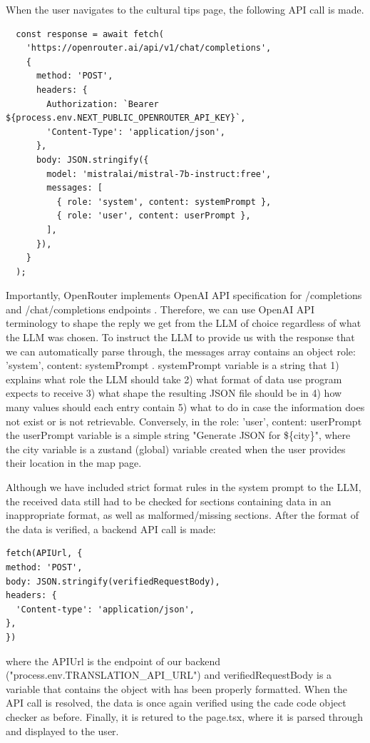 When the user navigates to the cultural tips page, the following API call is made. 
\begin{verbatim} 
  const response = await fetch(
    'https://openrouter.ai/api/v1/chat/completions',
    {
      method: 'POST',
      headers: {
        Authorization: `Bearer ${process.env.NEXT_PUBLIC_OPENROUTER_API_KEY}`,
        'Content-Type': 'application/json',
      },
      body: JSON.stringify({
        model: 'mistralai/mistral-7b-instruct:free',
        messages: [
          { role: 'system', content: systemPrompt },
          { role: 'user', content: userPrompt },
        ],
      }),
    }
  );
\end{verbatim}
Importantly, OpenRouter implements OpenAI API specification for /completions and /chat/completions endpoints \cite{noauthor_openrouter_nodate}. Therefore, we can use OpenAI API terminology \cite{openAI_explanation_onHowToUseTheirApi} to shape the reply we get from the LLM of choice regardless of what the LLM was chosen. To instruct the LLM to provide us with the response that we can automatically parse through, the messages array contains an object { role: 'system', content: systemPrompt }. systemPrompt variable is a string that 1) explains what role the LLM should take 2) what format of data use program expects to receive 3) what shape the resulting JSON file should be in 4) how many values should each entry contain 5) what to do in case the information does not exist or is not retrievable. Conversely, in the { role: 'user', content: userPrompt } the userPrompt variable is a simple string "Generate JSON for \$\{city\}", where the city variable is a zustand (global) variable created when the user provides their location in the map page. 

Although we have included strict format rules in the system prompt to the LLM, the received data still had to be checked for sections containing data in an inappropriate format, as well as malformed/missing sections. After the format of the data is verified, a backend API call is made:
\begin{verbatim} 
fetch(APIUrl, {
method: 'POST',
body: JSON.stringify(verifiedRequestBody),
headers: {
  'Content-type': 'application/json',
},
})
\end{verbatim}
where the APIUrl is the endpoint of our backend ("process.env.TRANSLATION\_API\_URL") and verifiedRequestBody is a variable that contains the object with has been properly formatted. When the API call is resolved, the data is once again verified using the cade code object checker as before. Finally, it is retured to the page.tsx, where it is parsed through and displayed to the user. 

